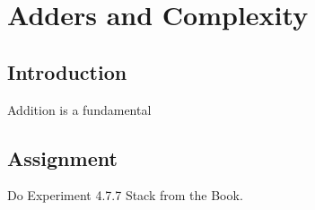 \chapter{Adders and Complexity}

\section{Introduction}

Addition is a fundamental 



\section{Assignment}

Do Experiment 4.7.7 Stack from the Book. 